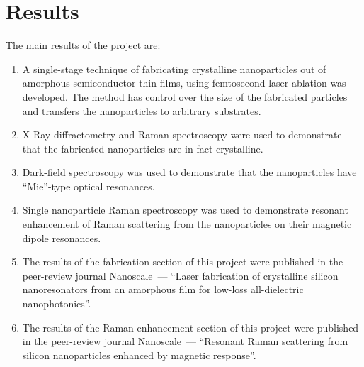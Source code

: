 \section{Results}
    The main results of the project are:
    \begin{enumerate}
        \item A single-stage technique of fabricating crystalline nanoparticles out of amorphous
            semiconductor thin-films, using femtosecond laser ablation was developed. The method
            has control over the size of the fabricated particles and transfers the nanoparticles
            to arbitrary substrates.
        \item X-Ray diffractometry and Raman spectroscopy were used to demonstrate that the
            fabricated nanoparticles are in fact crystalline.
        \item Dark-field spectroscopy was used to demonstrate that the nanoparticles have
            ``Mie''-type optical resonances.
        \item Single nanoparticle Raman spectroscopy was used to demonstrate resonant enhancement of Raman scattering
            from the nanoparticles on their magnetic dipole resonances.
        \item The results of the fabrication section of this project were published in the peer-review
            journal Nanoscale~--- ``Laser fabrication of
            crystalline silicon nanoresonators from an amorphous film for low-loss all-dielectric nanophotonics''\cite{dmitriev2016laser}.
        \item The results of the Raman enhancement section of this project were published in the peer-review
            journal Nanoscale~--- ``Resonant Raman scattering from silicon nanoparticles
            enhanced by magnetic response''\cite{dmitriev2016resonant}.
    \end{enumerate}
